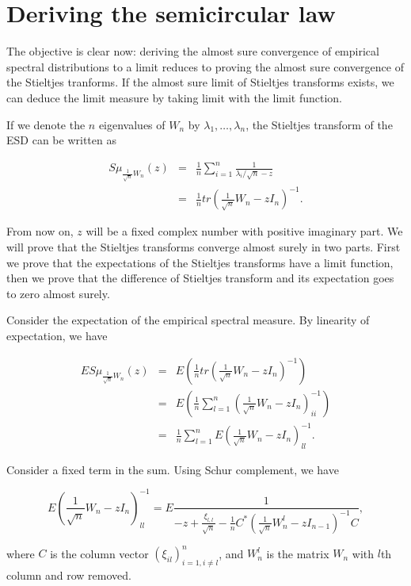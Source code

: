 \documentclass[12pt,a4paper,leqno]{report}
\theoremstyle{plain}
\theoremstyle{definition}
\theoremstyle{remark}
\begin{document}
\chapter{Deriving the semicircular law}\label{semic}

The objective is clear now: deriving the almost sure convergence of empirical spectral distributions to a limit reduces to proving the almost sure convergence of the Stieltjes tranforms.
If the almost sure limit of Stieltjes transforms exists, we can deduce the limit measure by taking limit with the limit function.

If we denote the $n$ eigenvalues of $W_n$ by $\lambda_1, \ldots, \lambda_n$,  the Stieltjes transform of the ESD can be written as

\begin{eqnarray*}
S\mu_{\frac{1}{\sqrt{n}}W_n}(z) & = & 
\frac{1}{n} \sum_{i=1}^n \frac{1}{\lambda_i/\sqrt{n} - z}\\
& = & \frac{1}{n} tr(\frac{1}{\sqrt{n}}W_n - z I_n)^{-1}.
\end{eqnarray*}

From now on, $z$ will be a fixed complex number with positive imaginary part. We will prove that the Stieltjes transforms converge almost surely in two parts. First we prove that the expectations of the Stieltjes transforms have a limit function, then we prove that the difference of Stieltjes transform and its expectation goes to zero almost surely.

Consider the expectation of the empirical spectral measure.  By linearity of expectation, we have

\begin{eqnarray*}
ES\mu_{\frac{1}{\sqrt{n}}W_n}(z) & = &
E(\frac{1}{n} tr(\frac{1}{\sqrt{n}}W_n - z I_n)^{-1})\\
& = & E(\frac{1}{n} \sum_{l=1}^n(\frac{1}{\sqrt{n}}W_n - z I_n)^{-1}_{ii})\\
& = & \frac{1}{n} \sum_{l=1}^n E(\frac{1}{\sqrt{n}}W_n - z I_n)^{-1}_{ll}.
\end{eqnarray*}

Consider a fixed term in the sum.
Using Schur complement, we have

\begin{equation*}
E(\frac{1}{\sqrt{n}}W_n - z I_n)^{-1}_{ll} = E\frac{1}{-z+\frac{\xi_{l,l}}{\sqrt{n}}-\frac{1}{n}C^* (\frac{1}{\sqrt{n}}W_n^l-zI_{n-1})^{-1}C},
\end{equation*}

where $C$ is the column vector $(\xi_{il})_{i=1, i\neq l}^{n}$, and $W_n^l$ is the matrix $W_n$ with $l$th column and row removed.
\end{document}
